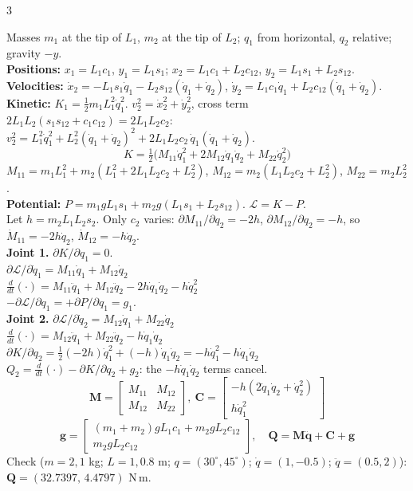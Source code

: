 \begin{multicols}{3}
\begin{fbx}
Masses $m_1$ at the tip of $L_1$, $m_2$ at the tip of $L_2$; $q_1$ from horizontal, $q_2$ relative; gravity $-y$.\\
\textbf{Positions:} $x_1=L_1c_1$, $y_1=L_1s_1$; $x_2=L_1c_1+L_2c_{12}$, $y_2=L_1s_1+L_2s_{12}$.\\
\textbf{Velocities:} $\dot x_2=-L_1s_1\dot q_1-L_2s_{12}(\dot q_1{+}\dot q_2)$, $\dot y_2=L_1c_1\dot q_1+L_2c_{12}(\dot q_1{+}\dot q_2)$.\\
\textbf{Kinetic:} $K_1=\tfrac12m_1L_1^2\dot q_1^2$. $v_2^2=\dot x_2^2+\dot y_2^2$, cross term $2L_1L_2(s_1s_{12}+c_1c_{12})=2L_1L_2c_2$:\\
$v_2^2=L_1^2\dot q_1^2+L_2^2(\dot q_1{+}\dot q_2)^2+2L_1L_2c_2\,\dot q_1(\dot q_1{+}\dot q_2)$.
\[K=\tfrac12\big(M_{11}\dot q_1^2+2M_{12}\dot q_1\dot q_2+M_{22}\dot q_2^2\big)\]
$M_{11}=m_1L_1^2+m_2(L_1^2+2L_1L_2c_2+L_2^2)$, $M_{12}=m_2(L_1L_2c_2+L_2^2)$, $M_{22}=m_2L_2^2$.\\
\textbf{Potential:} $P=m_1gL_1s_1+m_2g(L_1s_1+L_2s_{12})$. $\mathcal L=K-P$.\\
Let $h=m_2L_1L_2s_2$. Only $c_2$ varies: $\partial M_{11}/\partial q_2=-2h$, $\partial M_{12}/\partial q_2=-h$, so $\dot M_{11}=-2h\dot q_2$, $\dot M_{12}=-h\dot q_2$.\\
\textbf{Joint 1.} $\partial K/\partial q_1=0$.\\
$\partial\mathcal L/\partial\dot q_1=M_{11}\dot q_1+M_{12}\dot q_2$\\
$\tfrac d{dt}(\cdot)=M_{11}\ddot q_1+M_{12}\ddot q_2-2h\dot q_1\dot q_2-h\dot q_2^2$\\
$-\partial\mathcal L/\partial q_1=+\partial P/\partial q_1=g_1$.\\
\textbf{Joint 2.} $\partial\mathcal L/\partial\dot q_2=M_{12}\dot q_1+M_{22}\dot q_2$\\
$\tfrac d{dt}(\cdot)=M_{12}\ddot q_1+M_{22}\ddot q_2-h\dot q_1\dot q_2$\\
$\partial K/\partial q_2=\tfrac12(-2h)\dot q_1^2+(-h)\dot q_1\dot q_2=-h\dot q_1^2-h\dot q_1\dot q_2$\\
$Q_2=\tfrac d{dt}(\cdot)-\partial K/\partial q_2+g_2$: the $-h\dot q_1\dot q_2$ terms cancel.
\[\mathbf M=\begin{bmatrix}M_{11}&M_{12}\\M_{12}&M_{22}\end{bmatrix},\ \mathbf C=\begin{bmatrix}-h(2\dot q_1\dot q_2+\dot q_2^2)\\h\dot q_1^2\end{bmatrix}\]
\[\mathbf g=\begin{bmatrix}(m_1{+}m_2)gL_1c_1+m_2gL_2c_{12}\\m_2gL_2c_{12}\end{bmatrix},\quad \mathbf Q=\mathbf M\ddot{\mathbf q}+\mathbf C+\mathbf g\]
Check ($m=2,1$ kg; $L=1,0.8$ m; $q=(30^\circ,45^\circ)$; $\dot q=(1,-0.5)$; $\ddot q=(0.5,2)$): $\mathbf Q=(32.7397,\,4.4797)$ N\,m. \chk
\end{fbx}


\end{multicols}
